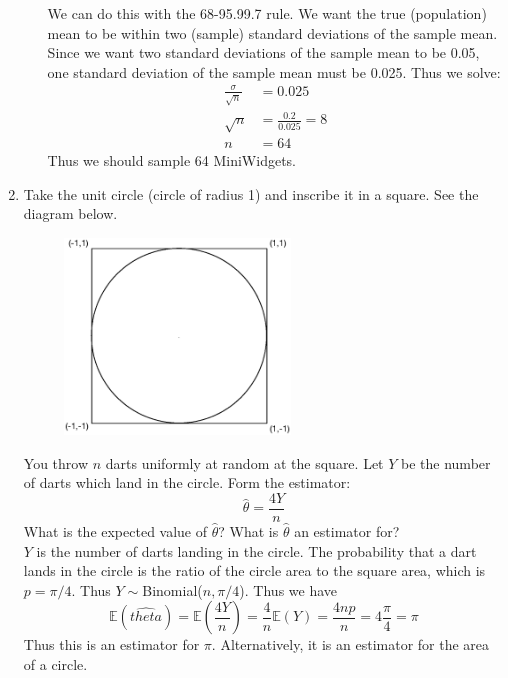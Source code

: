 \documentclass[12pt]{article}
\def\E{{\mathbb E}}
\begin{document}
\begin{enumerate}
\begin{enumerate}
We can do this with the 68-95.99.7 rule. We want the true (population) mean to be within two (sample) standard deviations of the sample mean. Since we want two standard deviations of the sample mean to be 0.05, one standard deviation of the sample mean must be 0.025. Thus we solve:
\begin{align*}
\frac{\sigma}{\sqrt{n}} &= 0.025 \\
\sqrt{n} &= \frac{0.2}{0.025} = 8\\
n &= 64
\end{align*}
Thus we should sample 64 MiniWidgets.
\end{enumerate}

\item Take the unit circle (circle of radius 1) and inscribe it in a square. See the diagram below.

\begin{figure}[H]
\centering
\includegraphics[width=6cm]{squarecircle.eps}
\end{figure}

You throw $n$ darts uniformly at random at the square. Let $Y$ be the number of darts which land in the circle. Form the estimator:
\[
\hat{\theta} = \frac{4Y}{n}
\]
What is the expected value of $\hat{\theta}$? What is $\hat{\theta}$ an estimator for?\\

$Y$ is the number of darts landing in the circle. The probability that a dart lands in the circle is the ratio of the circle area to the square area, which is $p = \pi / 4$. Thus $Y \sim $Binomial($n, \pi/4$). Thus we have
\[
\E(\hat{theta}) = \E\left( \frac{4Y}{n}\right) = \frac{4}{n} \E(Y) = \frac{4np}{n} = 4 \frac{\pi}{4} = \pi
\]
Thus this is an estimator for $\pi$. Alternatively, it is an estimator for the area of a circle.

\end{enumerate}
\end{document}
